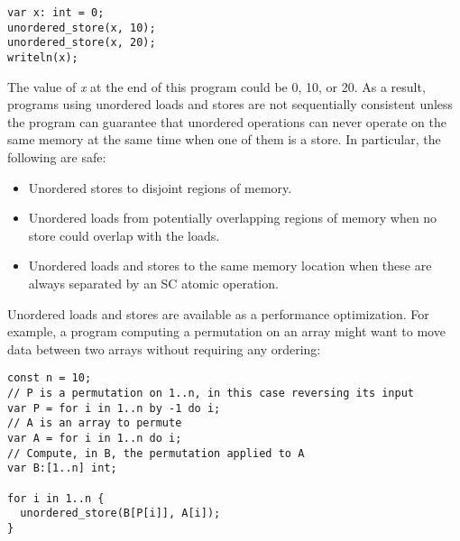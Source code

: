 \begin{chapel}
\begin{verbatim}
var x: int = 0;
unordered_store(x, 10);
unordered_store(x, 20);
writeln(x);
\end{verbatim}
\end{chapel}

The value of \textit{x} at the end of this program could be 0, 10, or 20. As a
result, programs using unordered loads and stores are not sequentially
consistent unless the program can guarantee that unordered operations
can never operate on the same memory at the same time when one of them is a
store. In particular, the following are safe:

\begin{itemize}
  \item Unordered stores to disjoint regions of memory.
  \item Unordered loads from potentially overlapping regions of memory when no store could overlap with the loads.
  \item Unordered loads and stores to the same memory location
  when these are always separated by an SC atomic operation.
\end{itemize}

Unordered loads and stores are available as a performance
optimization. For example, a program computing a permutation on an array might
want to move data between two arrays without requiring any ordering:

\begin{chapel}
\begin{verbatim}
const n = 10;
// P is a permutation on 1..n, in this case reversing its input
var P = for i in 1..n by -1 do i;
// A is an array to permute
var A = for i in 1..n do i;
// Compute, in B, the permutation applied to A
var B:[1..n] int;

for i in 1..n {
  unordered_store(B[P[i]], A[i]);
}
\end{verbatim}
\end{chapel}



